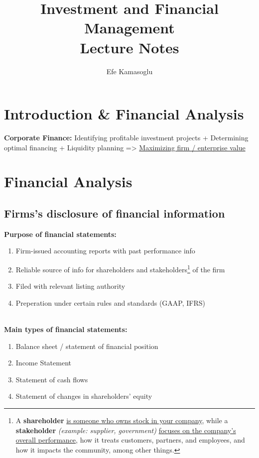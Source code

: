 \documentclass[ieeetran]{article}
\title{Investment and Financial Management \\Lecture Notes}
\author{Efe Kamasoglu}
\begin{document}
\maketitle

\pagebreak

\section{Introduction \& Financial Analysis} %
\label{sec:introduction_&_financial_analysis}

\textbf{Corporate Finance:}
Identifying profitable investment projects + Determining optimal financing + Liquidity planning
=> \underline{Maximizing firm / enterprise value}

\section{Financial Analysis} %
\label{sec:financial_analysis}




\subsection{Firms's disclosure of financial information} %
\label{sub:}




\textbf{Purpose of financial statements:}
\begin{enumerate}
  \item Firm-issued accounting reports with past performance info
\item Reliable source of info for shareholders and stakeholders\footnote{A \textbf{shareholder} \underline{is someone who owns stock in your company}, while a \textbf{stakeholder} \textit{(example: supplier, government)} \underline{focuses on the company's overall performance}, how it treats customers, partners, and employees, and how it impacts the community, among other things.} of the firm
  \item Filed with relevant listing authority
  \item Preperation under certain rules and standards (GAAP, IFRS)
\end{enumerate}

\textbf{\\Main types of financial statements:}
\begin{enumerate}
  \item Balance sheet / statement of financial position
  \item Income Statement 
  \item Statement of cash flows
  \item Statement of changes in shareholders' equity
\end{enumerate}
 
\end{document}
